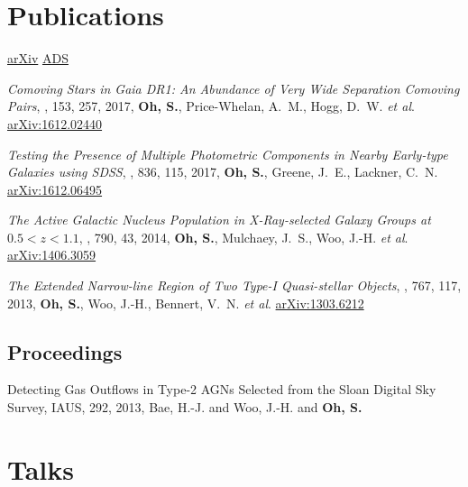 \documentclass[11pt,letterpaper]{article}
\newcommand*\arxiv[1]{\href{https://arxiv.org/abs/#1}{arXiv:#1}}
\newcommand{\etal}{\textit{et al}.}
\begin{document}
\section*{Publications}
\href{https://arxiv.org/find/all/1/all:+AND+semyeong+oh/0/1/0/all/0/1}{arXiv}
\href{http://adsabs.harvard.edu/cgi-bin/nph-abs_connect?library&libname=Semyeong+Oh&libid=4e8800e01f}{ADS}

\begin{etaremune}

  \item {\it Comoving Stars in Gaia DR1: An Abundance of Very Wide Separation Comoving Pairs},
    \aj, 153, 257, 2017, {{\bf {Oh}, S.}, {Price-Whelan}, A.~M., {Hogg}, D.~W. \etal}
    \arxiv{1612.02440}

  \item {\it Testing the Presence of Multiple Photometric Components in Nearby Early-type Galaxies using SDSS},
    \apj, 836, 115, 2017,
    {{\bf {Oh}, S.}, {Greene}, J.~E., {Lackner}, C.~N.}
		\arxiv{1612.06495}

  \item {\it The Active Galactic Nucleus Population in X-Ray-selected Galaxy Groups at $0.5 < z < 1.1$},
    \apj, 790, 43, 2014,
    {{\bf {Oh}, S.}, {Mulchaey}, J.~S., {Woo}, J.-H. \etal}
		\arxiv{1406.3059}

	\item {\it The Extended Narrow-line Region of Two Type-I Quasi-stellar Objects},
    \apj, 767, 117, 2013,
    {{\bf {Oh}, S.}, {Woo}, J.-H., {Bennert}, V.~N. \etal} \arxiv{1303.6212}
\end{etaremune}

\subsection*{Proceedings}

\begin{etaremune}
  \item {Detecting Gas Outflows in Type-2 AGNs Selected from the Sloan Digital Sky Survey},
  IAUS, 292, 2013,
  {{Bae}, H.-J. and {Woo}, J.-H. and {\bf {Oh}, S.}}
\end{etaremune}

\section*{Talks}
\end{document}
